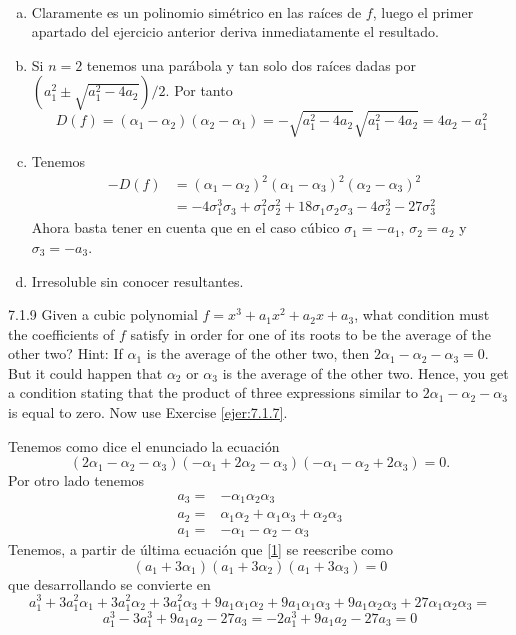\documentclass[twoside]{article}
\begin{document}
\begin{solucion}\
\begin{enumerate}[a.]
\item Claramente es un polinomio simétrico en las raíces de $f$, luego el primer apartado del ejercicio anterior deriva inmediatamente el resultado.
\item Si $n=2$ tenemos una parábola y tan solo dos raíces dadas por $(a_1^2\pm\sqrt{a_1^2-4a_2})/2$. Por tanto
$$
D(f)=(\alpha_1 - \alpha_2)(\alpha_2 - \alpha_1) =-\sqrt{a_1^2-4a_2}\sqrt{a_1^2-4a_2} = 4a_2 - a_1^2
$$
\item Tenemos
\begin{align*}
-D(f)&=(\alpha_1-\alpha_2)^2(\alpha_1-\alpha_3)^2(\alpha_2-\alpha_3)^2\\
&=-4\sigma_1^3\sigma_3 + \sigma_1^2\sigma_2^2 + 18\sigma_1\sigma_2\sigma_3 - 4\sigma_2^3 - 27\sigma_3^2
\end{align*}
Ahora basta tener en cuenta que en el caso cúbico $\sigma_1 = -a_1$, $\sigma_2 = a_2$ y $\sigma_3 = -a_3$.
\item Irresoluble sin conocer resultantes.
\end{enumerate}
\end{solucion}

\newpage
\begin{ejercicio}{7.1.9}
Given a cubic polynomial $f = x^3+a_1x^2+a_2x+a_3$, what condition must the coefficients
of $f$ satisfy in order for one of its roots to be the average of the other two? Hint: If $α_1$ is
the average of the other two, then $2α_1 − α_2 − α_3 = 0$. But it could happen that $α_2$ or
$α_3$ is the average of the other two. Hence, you get a condition stating that the product of
three expressions similar to $2α_1 − α_2 − α_3$ is equal to zero. Now use Exercise \ref{ejer:7.1.7}.
\end{ejercicio}
\begin{solucion}
Tenemos como dice el enunciado la ecuación
\begin{equation}\label{1}
(2α_1 − α_2 − α_3)(-α_1 + 2α_2 − α_3)(-α_1 − α_2 + 2α_3)=0.
\end{equation}
Por otro lado tenemos
\begin{align*}
a_3=&-\alpha_1\alpha_2\alpha_3\\
a_2= & \alpha_1\alpha_2+\alpha_1\alpha_3+\alpha_2\alpha_3\\
a_1=&-\alpha_1-\alpha_2-\alpha_3
\end{align*}
Tenemos, a partir de última ecuación que \ref{1} se reescribe como
\[
(a_1+3\alpha_1)(a_1+3\alpha_2)(a_1+3\alpha_3)=0
\]
que desarrollando se convierte en
\[
a_1^3 + 3a_1^2\alpha_1 + 3a_1^2\alpha_2 + 3a_1^2\alpha_3 + 9a_1\alpha_1\alpha_2+ 9a_1\alpha_1\alpha_3 + 9a_1\alpha_2\alpha_3 + 27\alpha_1\alpha_2\alpha_3=
\]
\[
a_1^3-3a_1^3+9a_1a_2-27a_3=-2a_1^3+9a_1a_2-27a_3=0
\]
\end{solucion}
\newpage
\end{document}
